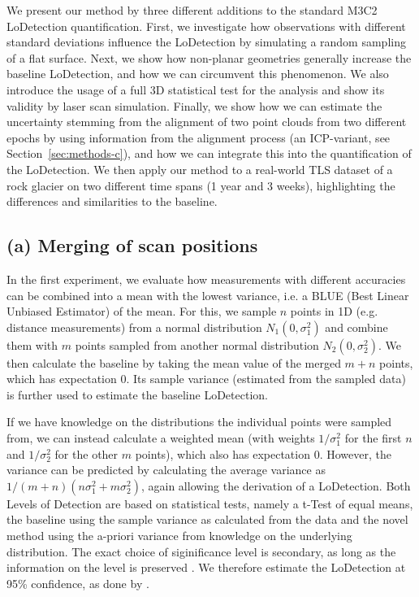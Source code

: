 \documentclass[preprint,12pt,3p]{elsarticle}
\begin{document}
We present our method by three different additions to the standard M3C2 LoDetection quantification. First, we investigate how observations with different standard deviations influence the LoDetection by simulating a random sampling of a flat surface. Next, we show how non-planar geometries generally increase the baseline LoDetection, and how we can circumvent this phenomenon. We also introduce the usage of a full 3D statistical test for the analysis and show its validity by laser scan simulation. Finally, we show how we can estimate the uncertainty stemming from the alignment of two point clouds from two different epochs by using information from the alignment process (an ICP-variant, see Section~\ref{sec:methods-c}), and how we can integrate this into the quantification of the LoDetection. We then apply our method to a real-world TLS dataset of a rock glacier on two different time spans (1 year and 3 weeks), highlighting the differences and similarities to the baseline.


\subsection{(a) Merging of scan positions}
\label{sec:methods-a}
In the first experiment, we evaluate how measurements with different accuracies can be combined into a mean with the lowest variance, i.e. a BLUE (Best Linear Unbiased Estimator) of the mean. For this, we sample $n$ points in 1D (e.g. distance measurements) from a normal distribution $N_1 (0, \sigma_1^2)$ and combine them with $m$ points sampled from another normal distribution $N_2(0, \sigma_2^2)$. We then calculate the baseline by taking the mean value of the merged $m+n$ points, which has expectation 0. Its sample variance (estimated from the sampled data) is further used to estimate the baseline LoDetection. 

If we have knowledge on the distributions the individual points were sampled from, we can instead calculate a weighted mean (with weights $1/\sigma_1^2$ for the first $n$ and $1/\sigma_2^2$ for the other $m$ points), which also has expectation 0. However, the variance can be predicted by calculating the average variance as $1/(m+n) (n\sigma_1^2 + m\sigma_2^2)$, again allowing the derivation of a LoDetection.
Both Levels of Detection are based on statistical tests, namely a t-Test of equal means, the baseline using the sample variance as calculated from the data and the novel method using the a-priori variance from knowledge on the underlying distribution. The exact choice of siginificance level is secondary, as long as the information on the level is preserved \citep{taylor1997introduction, lane2003estimation}. We therefore estimate the LoDetection at 95\% confidence, as done by \citet{Lague_2013}.
\end{document}
